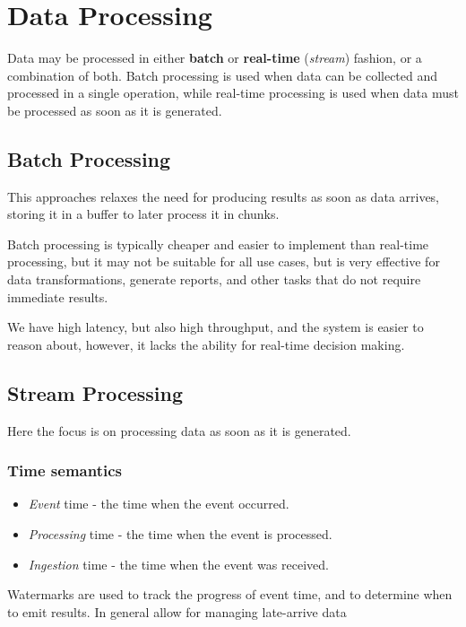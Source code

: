 \chapter{Data Processing}

Data may be processed in either \textbf{batch} or \textbf{real-time} (\textit{stream}) fashion, or a combination of both. Batch processing is used when data can be collected and processed in a single operation, while real-time processing is used when data must be processed as soon as it is generated.

\section{Batch Processing}
This approaches relaxes the need for producing results as soon as data arrives, storing it in a buffer to later process it in chunks.

Batch processing is typically cheaper and easier to implement than real-time processing, but it may not be suitable for all use cases, but is very effective for data transformations, generate reports, and other tasks that do not require immediate results.

We have high latency, but also high throughput, and the system is easier to reason about, however, it lacks the ability for real-time decision making.


\section{Stream Processing}

Here the focus is on processing data as soon as it is generated.

\subsection{Time semantics}
\begin{itemize}
   \item \textit{Event} time - the time when the event occurred.
   \item \textit{Processing} time - the time when the event is processed. 
   \item \textit{Ingestion} time - the time when the event was received. 
\end{itemize}

Watermarks are used to track the progress of event time, and to determine when to emit results. In general allow for managing late-arrive data

